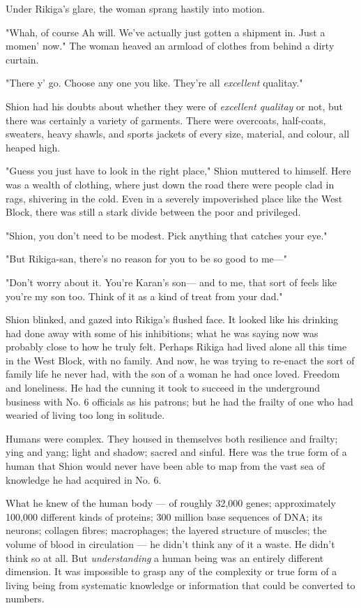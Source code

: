 Under Rikiga's glare, the woman sprang hastily into motion.

"Whah, of course Ah will. We've actually just gotten a shipment in. Just
a momen' now." The woman heaved an armload of clothes from behind a
dirty curtain.

"There y' go. Choose any one you like. They're all \emph{excellent} qualitay."

Shion had his doubts about whether they were of \emph{excellent qualitay} or
not, but there was certainly a variety of garments. There were
overcoats, half-coats, sweaters, heavy shawls, and sports jackets of
every size, material, and colour, all heaped high.

"Guess you just have to look in the right place," Shion muttered to
himself. Here was a wealth of clothing, where just down the road there
were people clad in rags, shivering in the cold. Even in a severely
impoverished place like the West Block, there was still a stark divide
between the poor and privileged.

"Shion, you don't need to be modest. Pick anything that catches your
eye."

"But Rikiga-san, there's no reason for you to be so good to me---"

"Don't worry about it. You're Karan's son--- and to me, that sort of feels
like you're my son too. Think of it as a kind of treat from your dad."

Shion blinked, and gazed into Rikiga's flushed face. It looked like his
drinking had done away with some of his inhibitions; what he was saying
now was probably close to how he truly felt. Perhaps Rikiga had lived
alone all this time in the West Block, with no family. And now, he was
trying to re-enact the sort of family life he never had, with the son of
a woman he had once loved. Freedom and loneliness. He had the cunning it
took to succeed in the underground business with No. 6 officials as his
patrons; but he had the frailty of one who had wearied of living too
long in solitude.

Humans were complex. They housed in themselves both resilience and
frailty; ying and yang; light and shadow; sacred and sinful. Here was
the true form of a human that Shion would never have been able to map
from the vast sea of knowledge he had acquired in No. 6.

What he knew of the human body --- of roughly 32,000 genes; approximately
100,000 different kinds of proteins; 300 million base sequences of DNA;
its neurons; collagen fibres; macrophages; the layered structure of
muscles; the volume of blood in circulation --- he didn't think any of it
a waste. He didn't think so at all. But \emph{understanding} a human being was
an entirely different dimension. It was impossible to grasp any of the
complexity or true form of a living being from systematic knowledge or
information that could be converted to numbers.

